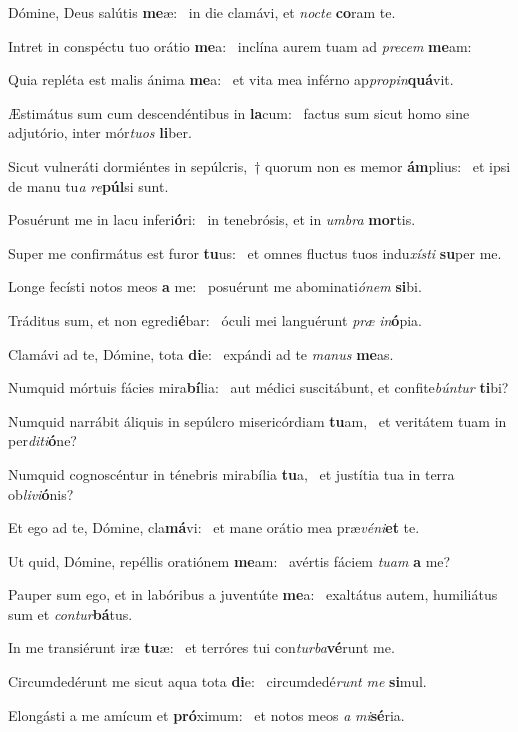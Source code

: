\item Dómine, Deus salútis \textbf{me}æ:~\psstar{} in die clamávi, et \textit{nocte} \textbf{co}ram te.
\item Intret in conspéctu tuo orátio \textbf{me}a:~\psstar{} inclína aurem tuam ad \textit{precem} \textbf{me}am:
\item Quia repléta est malis ánima \textbf{me}a:~\psstar{} et vita mea inférno ap\textit{propin}\textbf{quá}vit.
\item Æstimátus sum cum descendéntibus in \textbf{la}cum:~\psstar{} factus sum sicut homo sine adjutório, inter mór\textit{tuos} \textbf{li}ber.
\item Sicut vulneráti dormiéntes in sepúlcris,~† quorum non es memor \textbf{ám}plius:~\psstar{} et ipsi de manu tu\textit{a} \textit{re}\textbf{púl}si sunt.
\item Posuérunt me in lacu inferi\textbf{ó}ri:~\psstar{} in tenebrósis, et in \textit{umbra} \textbf{mor}tis.
\item Super me confirmátus est furor \textbf{tu}us:~\psstar{} et omnes fluctus tuos indu\textit{xísti} \textbf{su}per me.
\item Longe fecísti notos meos \textbf{a} me:~\psstar{} posuérunt me abominati\textit{ónem} \textbf{si}bi.
\item Tráditus sum, et non egredi\textbf{é}bar:~\psstar{} óculi mei languérunt \textit{præ} \textit{in}\textbf{ó}pia.
\item Clamávi ad te, Dómine, tota \textbf{di}e:~\psstar{} expándi ad te \textit{manus} \textbf{me}as.
\item Numquid mórtuis fácies mira\textbf{bí}lia:~\psstar{} aut médici suscitábunt, et confite\textit{búntur} \textbf{ti}bi?
\item Numquid narrábit áliquis in sepúlcro misericórdiam \textbf{tu}am,~\psstar{} et veritátem tuam in per\textit{diti}\textbf{ó}ne?
\item Numquid cognoscéntur in ténebris mirabília \textbf{tu}a,~\psstar{} et justítia tua in terra ob\textit{livi}\textbf{ó}nis?
\item Et ego ad te, Dómine, cla\textbf{má}vi:~\psstar{} et mane orátio mea præ\textit{véni}\textbf{et} te.
\item Ut quid, Dómine, repéllis oratiónem \textbf{me}am:~\psstar{} avértis fáciem \textit{tuam} \textbf{a} me?
\item Pauper sum ego, et in labóribus a juventúte \textbf{me}a:~\psstar{} exaltátus autem, humiliátus sum et \textit{contur}\textbf{bá}tus.
\item In me transiérunt iræ \textbf{tu}æ:~\psstar{} et terróres tui con\textit{turba}\textbf{vé}runt me.
\item Circumdedérunt me sicut aqua tota \textbf{di}e:~\psstar{} circumdedé\textit{runt} \textit{me} \textbf{si}mul.
\item Elongásti a me amícum et \textbf{pró}ximum:~\psstar{} et notos meos \textit{a} \textit{mi}\textbf{sé}ria.
